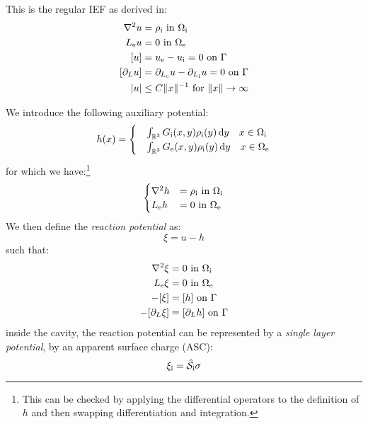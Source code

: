 This is the regular \acs{IEF} as derived in:~\autocite{Cances1998-og}
\begin{subequations}
\begin{align}
  \nabla^2 u &= \rho_\mathrm{i} \,\, \text{in}\,\, \Omega_\mathrm{i} \\
  L_\mathrm{e} u &= 0 \,\, \text{in}\,\, \Omega_\mathrm{e} \\
  [u] &= u_\mathrm{e} - u_\mathrm{i} = 0 \,\, \text{on}\,\, \Gamma \\
[\partial_L u] &= \partial_{L_\mathrm{e}} u - \partial_{L_\mathrm{i}} u = 0 \,\,
\text{on}\,\, \Gamma \\
|u| &\leq C \|x \|^{-1} \,\,\text{for}\,\,\| x \|\rightarrow\infty
\end{align}
\end{subequations}

We introduce the following auxiliary potential:
\begin{equation}
  h(x) =
  \begin{cases}
    &\int_{\mathbb{R}^3}G_\mathrm{i}(x, y)\rho_\mathrm{i}(y)\mathop{}\!\mathrm{d} y  \quad x \in \Omega_\mathrm{i} \\
    &\int_{\mathbb{R}^3}G_\mathrm{e}(x, y)\rho_\mathrm{i}(y)\mathop{}\!\mathrm{d} y  \quad x \in \Omega_\mathrm{e}
  \end{cases}
\end{equation}
for which we have:\footnote{This can be checked by applying the
differential operators to the definition of $h$ and then swapping
differentiation and integration.}
\begin{equation}
  \begin{cases}
    \nabla^2 h &= \rho_\mathrm{i} \,\, \text{in}\,\, \Omega_\mathrm{i} \\
    L_\mathrm{e} h &= 0 \,\, \text{in}\,\, \Omega_\mathrm{e}
  \end{cases}
\end{equation}
We then define the \emph{reaction potential} as:
\begin{equation}
  \xi = u - h
\end{equation}
such that:
\begin{subequations}
\begin{align}
  \nabla^2 \xi &= 0 \,\, \text{in}\,\, \Omega_\mathrm{i} \\
  L_\mathrm{e} \xi &= 0 \,\, \text{in}\,\, \Omega_\mathrm{e} \\
  -[\xi] &= [h] \,\, \text{on}\,\, \Gamma \\
  -[\partial_L \xi] &= [\partial_L h] \,\, \text{on}\,\, \Gamma
\end{align}
\end{subequations}
inside the cavity, the reaction potential can be represented by a
\emph{single layer potential}, \ie by an apparent surface charge (ASC):
\begin{equation}
  \xi_\mathrm{i} = \hat{\mathcal{S}}_\mathrm{i}\sigma
\end{equation}

